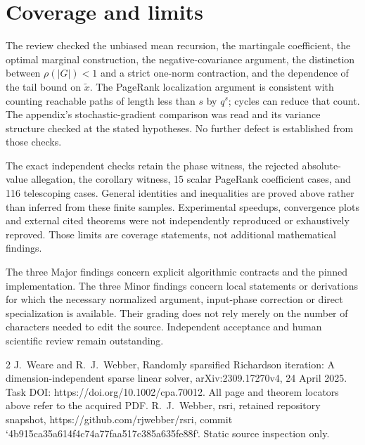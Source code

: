 \documentclass[10pt]{article}
\begin{document}
\section*{Coverage and limits}
The review checked the unbiased mean recursion, the martingale coefficient, the optimal marginal construction, the negative-covariance argument, the distinction between \(\rho(|G|)<1\) and a strict one-norm contraction, and the dependence of the tail bound on \(\widetilde x\). The PageRank localization argument is consistent with counting reachable paths of length less than \(s\) by \(q^s\); cycles can reduce that count. The appendix’s stochastic-gradient comparison was read and its variance structure checked at the stated hypotheses. No further defect is established from those checks.\par
The exact independent checks retain the phase witness, the rejected absolute-value allegation, the corollary witness, 15 scalar PageRank coefficient cases, and 116 telescoping cases. General identities and inequalities are proved above rather than inferred from these finite samples. Experimental speedups, convergence plots and external cited theorems were not independently reproduced or exhaustively reproved. Those limits are coverage statements, not additional mathematical findings.\par
The three Major findings concern explicit algorithmic contracts and the pinned implementation. The three Minor findings concern local statements or derivations for which the necessary normalized argument, input-phase correction or direct specialization is available. Their grading does not rely merely on the number of characters needed to edit the source. Independent acceptance and human scientific review remain outstanding.\par
2 J. Weare and R. J. Webber, Randomly sparsified Richardson iteration: A dimension-independent sparse linear solver, arXiv:2309.17270v4, 24 April 2025. Task DOI: https://doi.org/10.1002/cpa.70012. All page and theorem locators above refer to the acquired PDF. R. J. Webber, rsri, retained repository snapshot, https://github.com/rjwebber/rsri, commit `4b915ca35a614f4c74a77faa517c385a635fe88f`. Static source inspection only.\par
\end{document}
